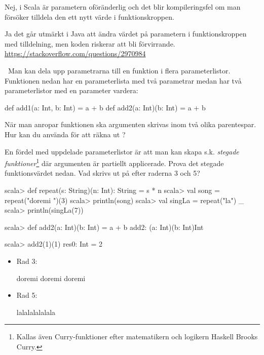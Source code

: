 \Subtask Nej, i Scala är parametern oföränderlig och det blir kompileringsfel om man försöker tilldela den ett nytt värde i funktionskroppen.

\Subtask Ja det går utmärkt i Java att ändra värdet på parametern i funktionskroppen med tilldelning, men koden riskerar att bli förvirrande.\\
\url{https://stackoverflow.com/questions/2970984}

\QUESTEND





\QUESTBEGIN

\Task \what~Man kan dela upp parametrarna till en funktion i flera parameterlistor. Funktionen  nedan har en parameterlista med två parametrar medan  har två parameterlistor med en parameter vardera:
\begin{Code}
  def add1(a: Int, b: Int) = a + b
  def add2(a: Int)(b: Int) = a + b
\end{Code}

\Subtask  När man anropar funktionen  ska argumenten skrivas inom två olika parentespar. Hur kan du använda  för att räkna ut ?

\Subtask En fördel med uppdelade parameterlistor är att man kan skapa s.k. \emph{stegade funktioner}\footnote{Kallas även Curry-funktioner efter matematikern och logikern Haskell Brooks Curry.} där argumenten är partiellt applicerade. Prova det stegade funktionsvärdet  nedan. Vad skrivs ut på efter raderna 3 och 5?

\begin{REPL}
scala> def repeat(s: String)(n: Int): String = s * n
scala> val song = repeat("doremi ")(3)
scala> println(song)
scala> val singLa = repeat("la") _
scala> println(singLa(7))
\end{REPL}

\SOLUTION

\TaskSolved \what

\SubtaskSolved
\begin{REPL}
scala> def add2(a: Int)(b: Int) = a + b
add2: (a: Int)(b: Int)Int

scala> add2(1)(1)
res0: Int = 2
\end{REPL}

\SubtaskSolved
\begin{itemize}

\item Rad 3:
\begin{REPLnonum}
doremi doremi doremi
\end{REPLnonum}

\item Rad 5:
\begin{REPLnonum}
lalalalalalala
\end{REPLnonum}

\end{itemize}


